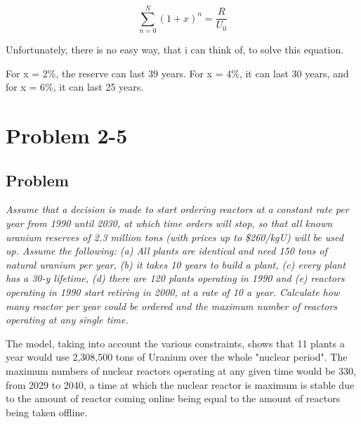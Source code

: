 \begin{equation}
\sum_{n=0}^N (1+x)^n = \frac{R}{U_0}
\end{equation}

Unfortunately, there is no easy way, that i can think of, to solve this equation.

For x = 2\%, the reserve can last 39 years. For x = 4\%, it can last 30 years, and for x = 6\%, it can last 25 years.


\section{Problem 2-5}
\label{prob25}


\subsection{Problem}
\textit{Assume that a decision is made to start ordering reactors at a constant rate per year from 1990 until 2030, at which time orders will stop, so that all known uranium reserves of 2.3 million tons (with prices up to \$260/kgU) will be used up. Assume the following: (a) All plants are identical and need 150 tons of natural uranium per year, (b) it takes 10 years to build a plant, (c) every plant has a 30-y lifetime, (d) there are 120 plants operating in 1990 and (e) reactors operating in 1990 start retiring in 2000, at a  rate of 10 a year. Calculate how many reactor per year could be ordered and the maximum number of reactors operating at any single time.}

The model, taking into account the various constraints, shows that 11 plants a year would use 2,308,500 tons of Uranium over the whole "nuclear period". The maximum numbers of nuclear reactors operating at any given time would be 330, from 2029 to 2040, a time at which the nuclear reactor is maximum is stable due to the amount of reactor coming online being equal to the amount of reactors being taken offline.


